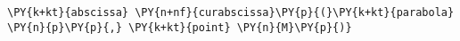 \begin{Verbatim}[commandchars=\\\{\}]
      \PY{k+kt}{abscissa} \PY{n+nf}{curabscissa}\PY{p}{(}\PY{k+kt}{parabola} \PY{n}{p}\PY{p}{,} \PY{k+kt}{point} \PY{n}{M}\PY{p}{)}
\end{Verbatim}
